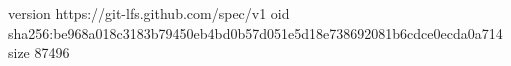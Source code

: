 version https://git-lfs.github.com/spec/v1
oid sha256:be968a018c3183b79450eb4bd0b57d051e5d18e738692081b6cdce0ecda0a714
size 87496
